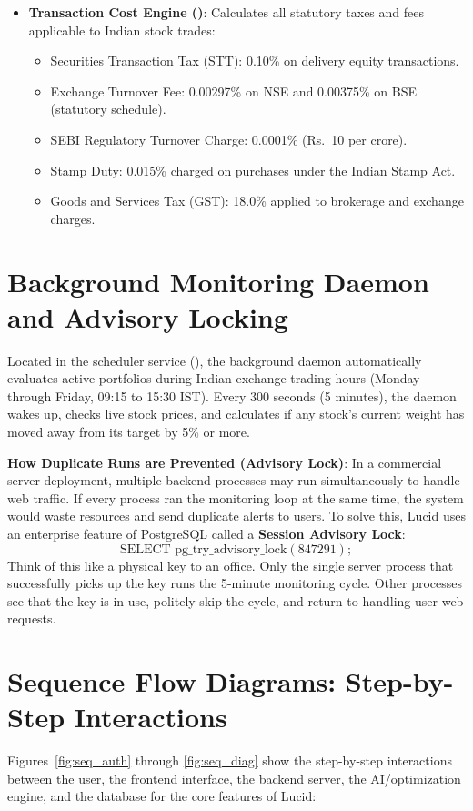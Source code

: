 \begin{itemize}
    \item \textbf{Transaction Cost Engine ()}: Calculates all statutory taxes and fees applicable to Indian stock trades:
    \begin{itemize}
        \item Securities Transaction Tax (STT): 0.10\% on delivery equity transactions.
        \item Exchange Turnover Fee: 0.00297\% on NSE and 0.00375\% on BSE (statutory schedule).
        \item SEBI Regulatory Turnover Charge: 0.0001\% (Rs.~10 per crore).
        \item Stamp Duty: 0.015\% charged on purchases under the Indian Stamp Act.
        \item Goods and Services Tax (GST): 18.0\% applied to brokerage and exchange charges.
    \end{itemize}
\end{itemize}

\section{Background Monitoring Daemon and Advisory Locking}
Located in the scheduler service (), the background daemon automatically evaluates active portfolios during Indian exchange trading hours (Monday through Friday, 09:15 to 15:30 IST). Every 300 seconds (5 minutes), the daemon wakes up, checks live stock prices, and calculates if any stock's current weight has moved away from its target by 5\% or more.

\textbf{How Duplicate Runs are Prevented (Advisory Lock)}:
In a commercial server deployment, multiple backend processes may run simultaneously to handle web traffic. If every process ran the monitoring loop at the same time, the system would waste resources and send duplicate alerts to users.
To solve this, Lucid uses an enterprise feature of PostgreSQL called a \textbf{Session Advisory Lock}:
\[
\text{SELECT pg\_try\_advisory\_lock}(847291);
\]
Think of this like a physical key to an office. Only the single server process that successfully picks up the key runs the 5-minute monitoring cycle. Other processes see that the key is in use, politely skip the cycle, and return to handling user web requests.

\section{Sequence Flow Diagrams: Step-by-Step Interactions}
Figures~\ref{fig:seq_auth} through \ref{fig:seq_diag} show the step-by-step interactions between the user, the frontend interface, the backend server, the AI/optimization engine, and the database for the core features of Lucid:

